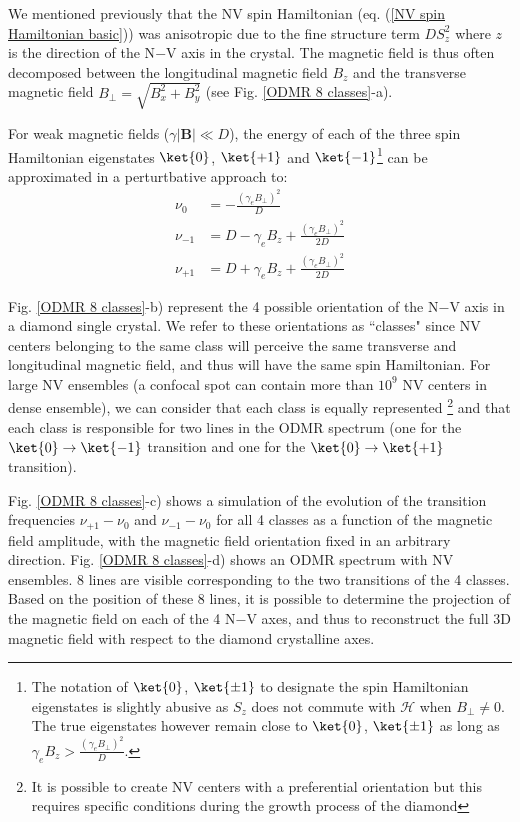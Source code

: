 \documentclass[a4paper,11pt]{report}
\begin{document}
\begin{refsection}
We mentioned previously that the NV spin Hamiltonian (eq. (\ref{NV spin Hamiltonian basic})) was anisotropic due to the fine structure term $D S_z^2$ where $z$ is the direction of the N$-$V axis in the crystal. The magnetic field is thus often decomposed between the longitudinal magnetic field $B_z$ and the transverse magnetic field $B_\perp=\sqrt{B_x^2+B_y^2}$ (see Fig. \ref{ODMR 8 classes}-a). 

For weak magnetic fields ($\gamma |\textbf{B}| \ll D$), the energy of each of the three spin Hamiltonian eigenstates $\ket{0}$, $\ket{+1}$ and $\ket{-1}$\footnote{The notation of $\ket{0}$, $\ket{\pm 1}$ to designate the spin Hamiltonian eigenstates is slightly abusive as $S_z$ does not commute with $\mathcal{H}$ when $B_\perp \neq 0$. The true eigenstates however remain close to $\ket{0}$, $\ket{\pm 1}$ as long as $\gamma_e B_z > \frac{(\gamma_e B_\perp)^2}{D}$.} can be approximated in a perturtbative approach to: %
\begin{align}
\nu_0&= -\frac{(\gamma_e B_\perp)^2}{D} \\
\nu_{-1} &= D - \gamma_e B_z + \frac{(\gamma_e B_\perp)^2}{2D} \\
\nu_{+1} &= D + \gamma_e B_z + \frac{(\gamma_e B_\perp)^2}{2D}
\end{align}

Fig. \ref{ODMR 8 classes}-b) represent the 4 possible orientation of the N$-$V axis in a diamond single crystal. We refer to these orientations as ``classes" since NV centers belonging to the same class will perceive the same transverse and longitudinal magnetic field, and thus will have the same spin Hamiltonian. For large NV ensembles (a confocal spot can contain more than $10^9$ NV centers in dense ensemble), we can consider that each class is equally represented \footnote{It is possible to create NV centers with a preferential orientation \citep{lesik2014perfect} but this requires specific conditions during the growth process of the diamond} and that each class is responsible for two lines in the ODMR spectrum (one for the $\ket{0} \to \ket{-1}$ transition and one for the $\ket{0} \to \ket{+1}$ transition). 

Fig. \ref{ODMR 8 classes}-c) shows a simulation of the evolution of the transition frequencies $\nu_{+1} - \nu_{0}$ and $\nu_{-1} - \nu_{0}$ for all 4 classes as a function of the magnetic field amplitude, with the magnetic field orientation fixed in an arbitrary direction. Fig. \ref{ODMR 8 classes}-d) shows an ODMR spectrum with NV ensembles. 8 lines are visible corresponding to the two transitions of the 4 classes. Based on the position of these 8 lines, it is possible to determine the projection of the magnetic field on each of the 4 N$-$V axes, and thus to reconstruct the full 3D magnetic field with respect to the diamond crystalline axes.


\end{refsection}
\end{document}
